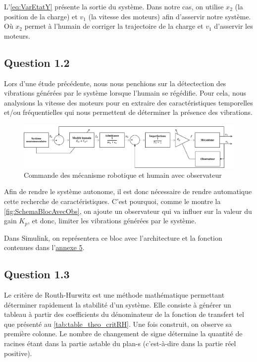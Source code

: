 \documentclass[a4paper,12pt]{article}
\begin{document}
    L'\autoref{eq:VarEtatY} présente la sortie du système. Dans notre cas, on utilise $x_2$ (la position de la charge) et $v_1$ (la vitesse des moteurs) afin d'asservir notre système. Où $x_2$ permet à l'humain de corriger la trajectoire de la charge et $v_1$ d'asservir les moteurs.
    
    
    \subsection{Question 1.2}
    Lors d'une étude précédente, nous nous penchions sur la détectection des vibrations générées par le système lorsque l'humain se régédifie. Pour cela, nous analysions la vitesse des moteurs pour en extraire des caractéristiques temporelles et/ou fréquentielles qui nous permettent de déterminer la présence des vibrations. \\
    
    \begin{figure}[H]
        \centering
        \includegraphics[width=16cm]{./img/SchemaBlocAvecObs.png}
        \caption{Commande des mécanisme robotique et humain avec observateur\label{fig:SchemaBlocAvecObs}}
    \end{figure}
    
    Afin de rendre le système autonome, il est donc nécessaire de rendre automatique cette recherche de caractéristiques. C'est pourquoi, comme le montre la \autoref{fig:SchemaBlocAvecObs}, on ajoute un observateur qui va influer sur la valeur du gain $K_p$, et donc, limiter les vibrations générées par le système.
    
    Dans Simulink, on représentera ce bloc avec l'architecture et la fonction contenues dans l'\hyperref[Annexe:modelObs]{annexe 5}.
    
    
    \subsection{Question 1.3}
    Le critère de Routh-Hurwitz est une méthode mathématique permettant déterminer rapidement la stabilité d'un système. Elle consiste à générer un tableau à partir des coefficients du dénominateur de la fonction de transfert tel que présenté au \autoref{tab:table_theo_critRH}. Une fois construit, on observe sa première colonne. Le nombre de changement de signe détermine la quantité de racines étant dans la partie astable du plan-s (c'est-à-dire dans la partie réel positive).
    
\end{document}
